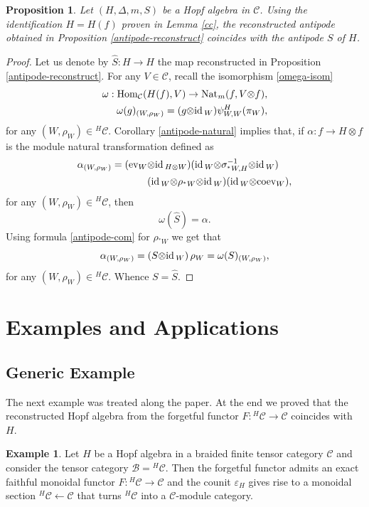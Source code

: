 \documentclass[11pt]{amsart}
\newcommand{\coev}{\mbox{coev}}
\newcommand{\ev}{\mbox{ev}}
\newcommand{\uc}{f}
\newcommand{\ot}{{\otimes}}
\newcommand{\vc}{{\mathcal C}}
\newcommand{\Bc}{{\mathcal B}}
\newcommand{\id}{\mbox{\rm id\,}}
\newcommand{\Nat}{\mbox{\rm Nat\,}}
\newcommand\Hom{\operatorname{Hom}}
\renewcommand{\_}[1]{\mbox{$_{\left( #1 \right)}$}}
\theoremstyle{plain}
\numberwithin{equation}{section}
\newtheorem{prop}[teo]{Proposition}
\theoremstyle{definition}
\newtheorem{exa}[teo]{Example}
\theoremstyle{remark}
\def\pf{\begin{proof}}
\def\epf{\end{proof}}
\theoremstyle{introTheorems}
\begin{document}
\begin{prop}  Let $(H,\Delta, m, S)$ be a  Hopf algebra in $\vc$. Using the identification $H=H(\uc)$ proven in Lemma \ref{cc}, the  reconstructed antipode obtained in Proposition \ref{antipode-reconstruct} coincides with the antipode $S$ of $H$. 
\end{prop}
\pf Let us denote by $\widehat{S}:H\to H$ the map reconstructed in Proposition \ref{antipode-reconstruct}. For any $V\in \vc$, recall the isomorphism \eqref{omega-isom}
\begin{equation*}
\begin{split} \omega: \Hom_\vc(H(\uc),V)\to \Nat_{\! m}(\uc, V\ot \uc),\\
\omega(g)_{(W,\rho_W)}= (g\ot \id_{W})\psi^{H}_{W,W}(\pi_W),
\end{split}
\end{equation*}  
for any $(W,\rho_W)\in {}^H\vc$.  Corollary \ref{antipode-natural} implies that, if $\alpha:\uc\to H\ot \uc$ is the module natural  transformation defined as
\begin{align*}
\alpha_{(W,\rho_W)}=( \ev_{W}&\ot \id_{H\ot W})(\id_{W}\ot \sigma^{-1}_{{}^*W,H}\ot \id_{ W})\\
& (\id_{W}\ot \rho_{{}^*W} \ot\id_{W})(\id_W\ot \coev_W),
\end{align*}
for any $(W,\rho_W)\in {}^H\vc$, then 
$$\omega(\widehat{S})=\alpha. $$ 
 Using formula  \eqref{antipode-com} for $\rho_{{}^*W}$ we get that
$$\alpha_{(W,\rho_W)}= (S\ot \id_{W})\, \rho_W=\omega(S)_{(W,\rho_W)}, $$
for any $(W,\rho_W)\in {}^H\vc$. Whence $S=\widehat{S}$.
\epf

\section{Examples and Applications}\label{section_Example}

\subsection{Generic Example}

The next example was treated along the paper. At the end we proved that the reconstructed Hopf algebra from the forgetful functor $F:{^H}\vc\to \vc$ coincides with $H.$

\begin{exa}
Let $H$ be a Hopf algebra in a braided finite tensor category $\vc$ and consider the tensor category $\Bc={^H}\vc$. Then the forgetful functor admits an exact faithful monoidal functor $F:{^H}\vc\to \vc$ and  the counit $\varepsilon_H$ gives rise to a monoidal section ${^H}\vc\leftarrow \vc$ that turns ${^H}\vc$ into a $\vc$-module category. 
\end{exa}
\end{document}
